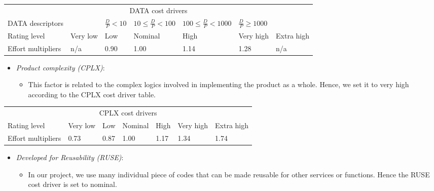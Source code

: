 \begin{table}[H]
	\hspace*{-1.7cm}
	\begin{tabular}{|p{2cm}|p{2cm}|p{2cm}|p{2cm}|p{2cm}|p{2cm}|p{2cm}|}
		\hline
		\multicolumn{7}{|c|}{DATA cost drivers} \\
		\hhline{|=======|}
		DATA descriptors & & \(\frac{D}{P} < 10\) & \(10 \leq \frac{D}{P} < 100\) & \(100 \leq \frac{D}{P} < 1000\) & \(\frac{D}{P} \geq 1000\) & \\
		\hline
		Rating level & Very low & Low & Nominal & High & Very high & Extra high \\
		\hline
		Effort multipliers & n/a & 0.90 & 1.00 & 1.14 & 1.28 & n/a \\
		\hline
	\end{tabular}
\end{table}

\begin{itemize}
	\item \emph{Product complexity (CPLX)}:
	\begin{itemize}
		\item[] This factor is related to the complex logics involved in implementing the product as a whole.
Hence, we set it to very high according to the CPLX cost driver table.
	\end{itemize}
\end{itemize}

\begin{table}[H]
	\hspace*{-1.7cm}
	\begin{tabular}{|p{2cm}|p{2cm}|p{2cm}|p{2cm}|p{2cm}|p{2cm}|p{2cm}|}
		\hline
		\multicolumn{7}{|c|}{CPLX cost drivers} \\
		\hhline{|=======|}
		Rating level & Very low & Low & Nominal & High & Very high & Extra high \\
		\hline
		Effort multipliers & 0.73 & 0.87 & 1.00 & 1.17 & 1.34 & 1.74 \\
		\hline
	\end{tabular}
\end{table}

\begin{itemize}
	\item \emph{Developed for Reusability (RUSE)}:
	\begin{itemize}
		\item[] In our project, we use many individual piece of codes that can be made reusable for other services or functions.
Hence the RUSE cost driver is set to nominal.
	\end{itemize}
\end{itemize}

